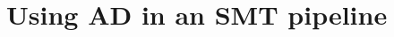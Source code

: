 \documentclass[11pt,a4paper]{article}
\newcommand{\ad}{\textsc{AD}}
\begin{document}



\section{Using \ad{} in an SMT pipeline}

\end{document}
